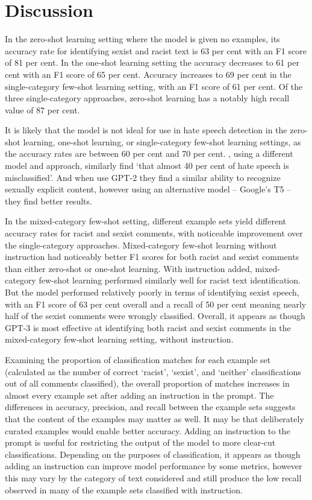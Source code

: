 \documentclass[12pt,]{article}
\begin{document}
\hypertarget{discussion}{%
\section{Discussion}\label{discussion}}

In the zero-shot learning setting where the model is given no examples, its accuracy rate for identifying sexist and racist text is 63 per cent with an F1 score of 81 per cent. In the one-shot learning setting the accuracy decreases to 61 per cent with an F1 score of 65 per cent. Accuracy increases to 69 per cent in the single-category few-shot learning setting, with an F1 score of 61 per cent. Of the three single-category approaches, zero-shot learning has a notably high recall value of 87 per cent.

It is likely that the model is not ideal for use in hate speech detection in the zero-shot learning, one-shot learning, or single-category few-shot learning settings, as the accuracy rates are between 60 per cent and 70 per cent. \citet{davidson2017automated}, using a different model and approach, similarly find `that almost 40 per cent of hate speech is misclassified'. And when \citet{schick2021selfdiagnosis} use GPT-2 they find a similar ability to recognize sexually explicit content, however using an alternative model -- Google's T5 \citep{raffel2020exploring} -- they find better results.

In the mixed-category few-shot setting, different example sets yield different accuracy rates for racist and sexist comments, with noticeable improvement over the single-category approaches. Mixed-category few-shot learning without instruction had noticeably better F1 scores for both racist and sexist comments than either zero-shot or one-shot learning. With instruction added, mixed-category few-shot learning performed similarly well for racist text identification. But the model performed relatively poorly in terms of identifying sexist speech, with an F1 score of 63 per cent overall and a recall of 50 per cent meaning nearly half of the sexist comments were wrongly classified. Overall, it appears as though GPT-3 is most effective at identifying both racist and sexist comments in the mixed-category few-shot learning setting, without instruction.

Examining the proportion of classification matches for each example set (calculated as the number of correct `racist', `sexist', and `neither' classifications out of all comments classified), the overall proportion of matches increases in almost every example set after adding an instruction in the prompt. The differences in accuracy, precision, and recall between the example sets suggests that the content of the examples may matter as well. It may be that deliberately curated examples would enable better accuracy. Adding an instruction to the prompt is useful for restricting the output of the model to more clear-cut classifications. Depending on the purposes of classification, it appears as though adding an instruction can improve model performance by some metrics, however this may vary by the category of text considered and still produce the low recall observed in many of the example sets classified with instruction.
\end{document}
